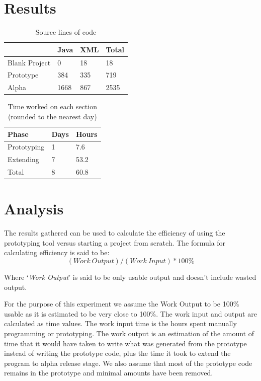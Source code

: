 \documentclass[11pt,english,numbers=endperiod,parskip=half,abstract=on]{scrreprt}
\begin{document}
\section{Results}
\begin{table}[H]

  \centering
  \begin{tabularx}{0.5\textwidth}{|l|X|X|X|}
    \hline
    & \textbf{Java} & \textbf{XML} & \textbf{Total} \\
    \hline
    Blank Project & 0 & 18 & 18 \\
    \hline
    Prototype & 384 & 335 & 719 \\
    \hline
    Alpha & 1668 & 867 & 2535 \\
    \hline
  \end{tabularx}
  \caption{Source lines of code}
\end{table}

\begin{table}[H]

  \centering
  \begin{tabularx}{0.5\textwidth}{|l|X|X|}
    \hline
    \textbf{Phase} & \textbf{Days} & \textbf{Hours} \\
    \hline
    Prototyping & 1 & 7.6 \\
    \hline
    Extending & 7 & 53.2 \\
    \hline
    Total & 8 & 60.8 \\
    \hline
  \end{tabularx}
  \caption{Time worked on each section (rounded to the nearest day)}
\end{table}
\section{Analysis}
  The results gathered can be used to calculate the efficiency of using the
  prototyping tool versus starting a project from scratch. The formula for
  calculating efficiency is said to be:
  \[
    (Work\ Output) / (Work\ Input) * 100 \%
  \]

  Where `\textit{Work Output}' is said to be only usable output and doesn't
  include wasted output.

  For the purpose of this experiment we assume the Work Output to be 100\%
  usable as it is estimated to be very close to 100\%. The work input and output
  are calculated as time values. The work input time is the hours spent manually
  programming or prototyping. The work output is an estimation of the amount of
  time that it would have taken to write what was generated from the prototype
  instead of writing the prototype code, plus the time it took to extend the
  program to alpha release stage. We also assume that most of the prototype
  code remains in the prototype and minimal amounts have been removed.
\end{document}
